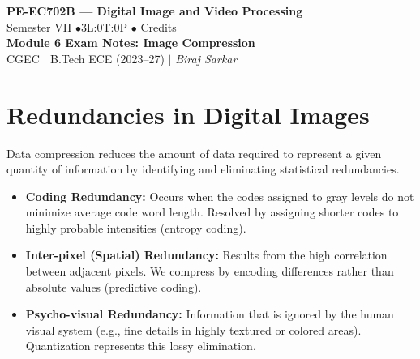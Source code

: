\documentclass[12pt,a4paper]{article}
\begin{document}

\begin{center}
  {\LARGE\bfseries\color{myred} PE-EC702B --- Digital Image and Video Processing}\\[5pt]
  {\normalsize\color{mydark} Semester VII \quad$\bullet$\quad 3L:0T:0P \quad$\bullet$ Credits}\\[3pt]
  {\normalsize\color{myteal}\textbf{Module 6 Exam Notes: Image Compression}}\\[3pt]
  {\small\color{mydark} CGEC \;$|$\; B.Tech ECE (2023--27) \;$|$\; \textit{Biraj Sarkar}}
\end{center}
\vspace{2pt}
\noindent{\color{myred}\rule{\linewidth}{1.5pt}}
\vspace{2pt}

\hypersetup{linkcolor=mydark}
\tableofcontents
\hypersetup{linkcolor=myteal}
\newpage

\section{Redundancies in Digital Images}

Data compression reduces the amount of data required to represent a given quantity of information by identifying and eliminating statistical redundancies.

\begin{tcolorbox}[defbox, title={Types of Image Redundancy}]
\begin{itemize}[leftmargin=*, itemsep=3.5pt]
  \item \textbf{Coding Redundancy:} Occurs when the codes assigned to gray levels do not minimize average code word length. Resolved by assigning shorter codes to highly probable intensities (entropy coding).
  \item \textbf{Inter-pixel (Spatial) Redundancy:} Results from the high correlation between adjacent pixels. We compress by encoding differences rather than absolute values (predictive coding).
  \item \textbf{Psycho-visual Redundancy:} Information that is ignored by the human visual system (e.g., fine details in highly textured or colored areas). Quantization represents this lossy elimination.
\end{itemize}
\end{tcolorbox}
\end{document}

